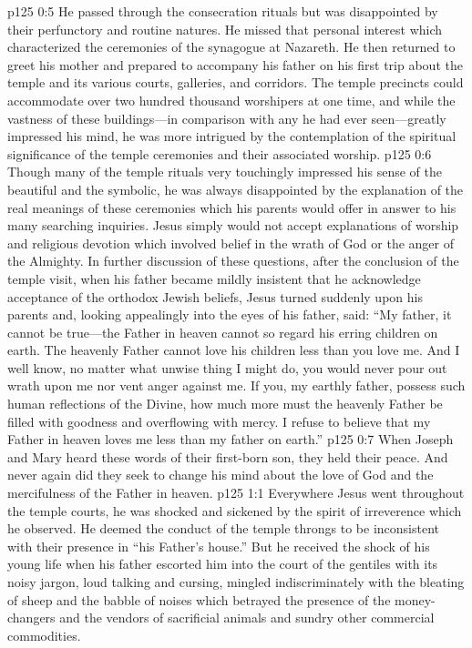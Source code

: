 \vs p125 0:5 He passed through the consecration rituals but was disappointed by their perfunctory and routine natures. He missed that personal interest which characterized the ceremonies of the synagogue at Nazareth. He then returned to greet his mother and prepared to accompany his father on his first trip about the temple and its various courts, galleries, and corridors. The temple precincts could accommodate over two hundred thousand worshipers at one time, and while the vastness of these buildings---in comparison with any he had ever seen---greatly impressed his mind, he was more intrigued by the contemplation of the spiritual significance of the temple ceremonies and their associated worship.
\vs p125 0:6 Though many of the temple rituals very touchingly impressed his sense of the beautiful and the symbolic, he was always disappointed by the explanation of the real meanings of these ceremonies which his parents would offer in answer to his many searching inquiries. Jesus simply would not accept explanations of worship and religious devotion which involved belief in the wrath of God or the anger of the Almighty. In further discussion of these questions, after the conclusion of the temple visit, when his father became mildly insistent that he acknowledge acceptance of the orthodox Jewish beliefs, Jesus turned suddenly upon his parents and, looking appealingly into the eyes of his father, said: \textcolor{ubdarkred}{“My father, it cannot be true---the Father in heaven cannot so regard his erring children on earth. The heavenly Father cannot love his children less than you love me. And I well know, no matter what unwise thing I might do, you would never pour out wrath upon me nor vent anger against me. If you, my earthly father, possess such human reflections of the Divine, how much more must the heavenly Father be filled with goodness and overflowing with mercy. I refuse to believe that my Father in heaven loves me less than my father on earth.”}
\vs p125 0:7 When Joseph and Mary heard these words of their first\hyp{}born son, they held their peace. And never again did they seek to change his mind about the love of God and the mercifulness of the Father in heaven.
\vs p125 1:1 Everywhere Jesus went throughout the temple courts, he was shocked and sickened by the spirit of irreverence which he observed. He deemed the conduct of the temple throngs to be inconsistent with their presence in “his Father’s house.” But he received the shock of his young life when his father escorted him into the court of the gentiles with its noisy jargon, loud talking and cursing, mingled indiscriminately with the bleating of sheep and the babble of noises which betrayed the presence of the money\hyp{}changers and the vendors of sacrificial animals and sundry other commercial commodities.
